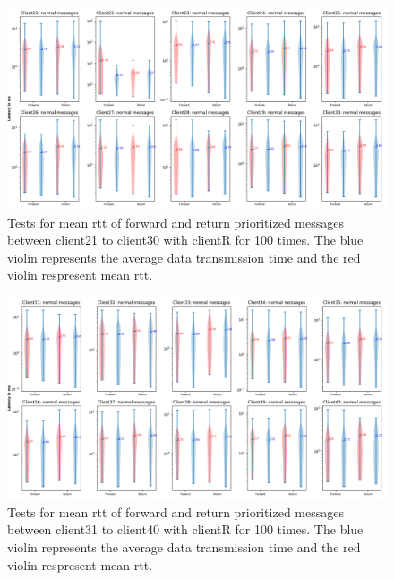 \begin{figure}
    \includegraphics[width=\textheight]{figures/appendix/priority_tests/log_violin_50clients_figure_3.png}\hfill 
    \caption{Tests for mean \gls{rtt} of forward and return prioritized messages between client21 to client30 
    with clientR for 100 times. The blue violin represents the average data transmission time and the red violin 
    respresent mean \gls{rtt}.} \label{fig: priority-50clients-c}
\end{figure}

\begin{figure}
    \includegraphics[width=\textheight]{figures/appendix/priority_tests/log_violin_50clients_figure_4.png}\hfill 
    \caption{Tests for mean \gls{rtt} of forward and return prioritized messages between client31 to client40 
    with clientR for 100 times. The blue violin represents the average data transmission time and the red violin 
    respresent mean \gls{rtt}.} \label{fig: priority-50clients-d}
\end{figure}

